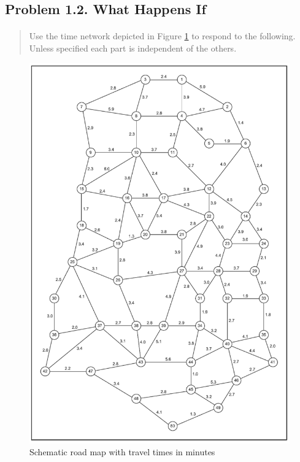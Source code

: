 \subsection{Problem 1.2. What Happens If}

\paragraph{}
\begin{quote}
Use the time network depicted in Figure \ref{figure1-11} to respond to the following. Unless specified each part is independent of the others.
\end{quote}

\begin{figure}[H]
\centering
\includegraphics[scale=1]{./img/figure1-11.png}
\caption{Schematic road map with travel times in minutes}
\label{figure1-11}
\end{figure}

